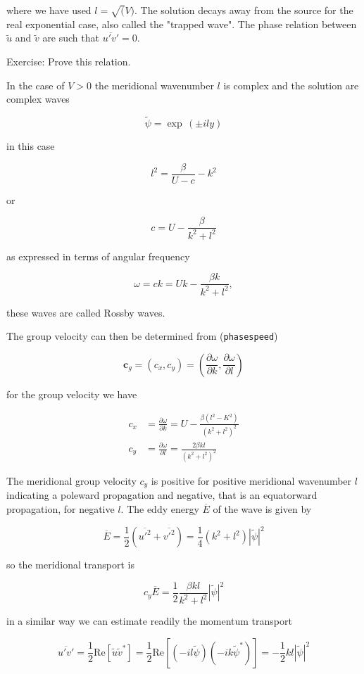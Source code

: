 where we have used \(l=\sqrt(V)\). The solution decays away from the
source for the real exponential case, also called the "trapped wave".
The phase relation between \(\tilde{u}\) and \(\tilde{v}\) are such that
\(\overline{u'v'} = 0\).

Exercise: Prove this relation.

In the case of \(V>0\) the meridional wavenumber \(l\) is complex and
the solution are complex waves

\[\tilde{\psi} = \exp\,( \pm i l y)\]

in this case

\[l^2=\frac{\beta}{U-c} - k^2\]

or

{\[c=U -\frac{\beta}{k^2+l^2}\]}

as expressed in terms of angular frequency

\[\omega = c k = U k -\frac{\beta k}{k^2+l^2},\]

these waves are called Rossby waves.

The group velocity can then be determined from (\texttt{phasespeed})

\[\mathbf{c}_g = (c_x, c_y) = (\frac{\partial \omega}{\partial k},\frac{\partial \omega}{\partial l})\]

for the group velocity we have

\[\begin{aligned}
c_x &= \frac{\partial \omega}{\partial k} =U -\frac{ \beta (l^2-K^2)}{(k^2+l^2)^2}\\
c_y &= \frac{\partial \omega}{\partial l} =\frac{2 \beta k l}{(k^2+l^2)^2}
\end{aligned}\]

The meridional group velocity \(c_y\) is positive for positive
meridional wavenumber \(l\) indicating a poleward propagation and
negative, that is an equatorward propagation, for negative \(l\). The
eddy energy \(\overline{E}\) of the wave is given by

\[\overline{E}=  \frac{1}{2}(\overline{u'^2} +\overline{v'^2})=\frac{1}{4} (k^2+l^2)|\tilde{\psi}|^2\]

so the meridional transport is

\[c_y \overline{E}= \frac{1}{2}\frac{\beta k l }{k^2+l^2}|\tilde{\psi}|^2\]

in a similar way we can estimate readily the momentum transport

\[\overline{u'v'} = \frac{1}{2}\mathrm{Re}\left[ \tilde{u}\tilde{v}^*\right]=\frac{1}{2}\mathrm{Re}\left[ (-il\tilde{\psi})(-ik\tilde{\psi}^*)\right]=-\frac{1}{2}kl|\tilde{\psi}|^2\]


